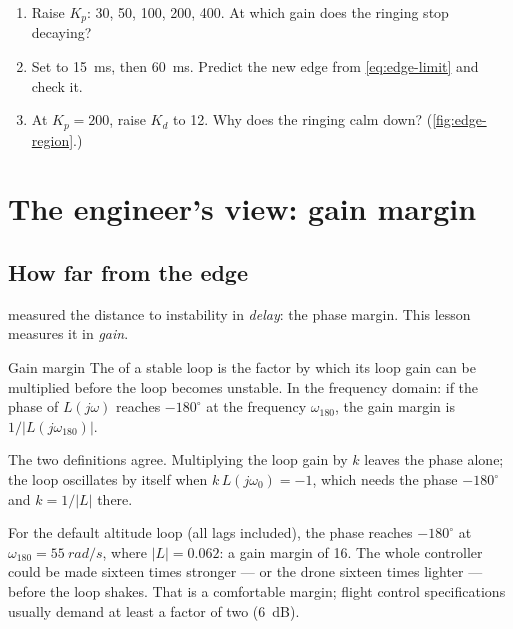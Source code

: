 \begin{trythis}
\begin{enumerate}
  \item Raise $K_p$: 30, 50, 100, 200, 400. At which gain does the ringing stop decaying?
  \item Set  to \SI{15}{ms}, then \SI{60}{ms}. Predict the new edge from \cref{eq:edge-limit} and check it.
  \item At $K_p = 200$, raise $K_d$ to 12. Why does the ringing calm down? (\cref{fig:edge-region}.)
\end{enumerate}
\end{trythis}

\section{The engineer's view: gain margin}

\subsection{How far from the edge}
 measured the distance to instability in \emph{delay}: the phase margin. This lesson measures it in \emph{gain}.

\begin{definition}{Gain margin}
The  of a stable loop is the factor by which its loop gain can be multiplied before the loop becomes unstable. In the frequency domain: if the phase of $L(j\omega)$ reaches $-180^\circ$ at the frequency $\omega_{180}$, the gain margin is $1/|L(j\omega_{180})|$.
\end{definition}

The two definitions agree. Multiplying the loop gain by $k$ leaves the phase alone; the loop oscillates by itself when $k\,L(j\omega_0) = -1$, which needs the phase $-180^\circ$ and $k = 1/|L|$ there.

For the default altitude loop (all lags included), the phase reaches $-180^\circ$ at $\omega_{180} = \SI{55}{rad/s}$, where $|L| = 0.062$: a gain margin of 16. The whole controller could be made sixteen times stronger — or the drone sixteen times lighter — before the loop shakes. That is a comfortable margin; flight control specifications usually demand at least a factor of two (\SI{6}{dB}).

